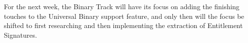 
For the next week, the Binary Track will have its focus on adding the
finishing touches to the Universal Binary support feature, and only then will
the focus be shifted to first researching and then implementing the extraction
of Entitlement Signatures.
